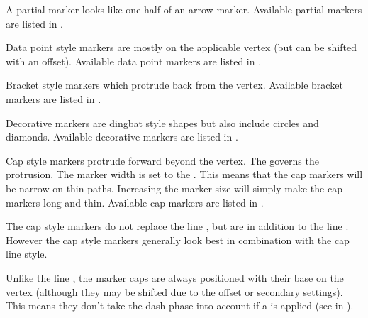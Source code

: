 
A partial marker looks like one half of an arrow marker.
Available partial markers are listed in .


Data point style markers are mostly  on the applicable
vertex (but can be shifted with an offset).
Available data point markers are listed in .


Bracket style markers which protrude back from the vertex.
Available bracket markers are listed in .


Decorative markers are dingbat style shapes but also include circles
and diamonds.
Available decorative markers are listed in .

Cap style markers protrude forward beyond the vertex.
The  governs the protrusion. The marker width is set to
the . This means that the cap markers will be
narrow on thin \glspl{path}. Increasing the marker size will simply make
the cap markers long and thin.
Available cap markers are listed in .

\begin{important}
The cap style markers do not replace the line ,
but are in addition to the line . However the cap style
markers generally look best in combination with the
 cap line style.
\end{important}

Unlike the line , the marker caps are always
positioned with their base on the vertex (although they may be
shifted due to the offset or secondary settings). This means they
don't take the dash phase into account if a 
is applied (see  in
).

